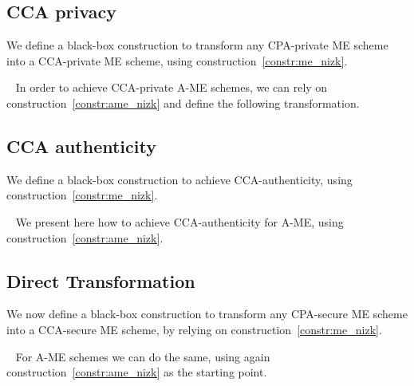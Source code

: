 \subsection{CCA privacy}\label{sec:cca-priv-transformation}
We define a black-box construction to transform any CPA-private ME scheme into a CCA-private ME scheme, using construction~\ref{constr:me_nizk}.

~\newline
In order to achieve CCA-private A-ME schemes, we can rely on construction~\ref{constr:ame_nizk} and define the following transformation.


\subsection{CCA authenticity}\label{sec:cca-auth-transformation}
We define a black-box construction to achieve CCA-authenticity, using construction~\ref{constr:me_nizk}.

~\newline
We present here how to achieve CCA-authenticity for A-ME, using construction~\ref{constr:ame_nizk}.


\subsection{Direct Transformation}\label{sec:cca-full-transformation}
We now define a black-box construction to transform any CPA-secure ME scheme into a CCA-secure ME scheme, by relying on construction~\ref{constr:me_nizk}.

~\newline
For A-ME schemes we can do the same, using again construction~\ref{constr:ame_nizk} as the starting point.

